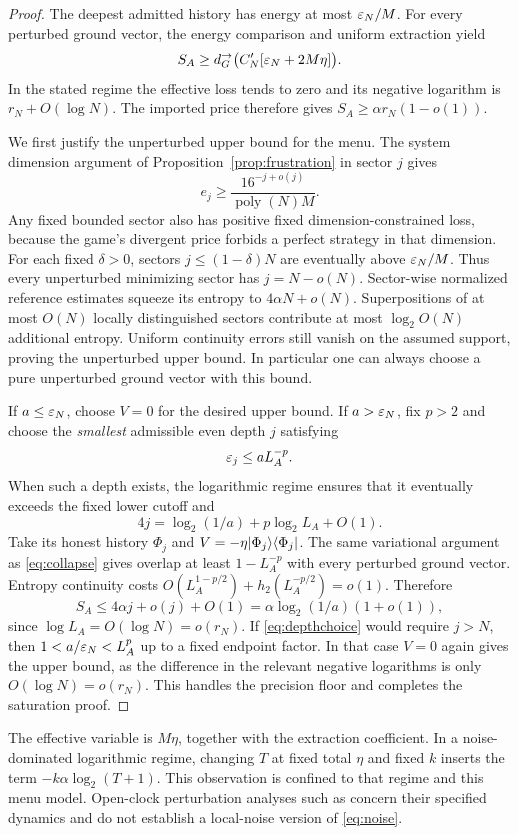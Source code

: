 \begin{proof}
The deepest admitted history has energy at most $\varepsilon_N/M$.
For every perturbed ground vector, the energy comparison and uniform
extraction yield
\[
 S_A\geq d_G^{\to}\bigl(C'_N[\varepsilon_N+2M\eta]\bigr).
\]
In the stated regime the effective loss tends to zero and its
negative logarithm is $r_N+O(\log N)$. The imported price therefore
gives $S_A\geq\alpha r_N(1-o(1))$.

We first justify the unperturbed upper bound for the menu. The system
dimension argument of Proposition~\ref{prop:frustration} in sector
$j$ gives
\[
 e_j\geq\frac{16^{-j+o(j)}}{\operatorname{poly}(N)M}.
\]
Any fixed bounded sector also has positive fixed dimension-constrained
loss, because the game's divergent price forbids a perfect strategy
in that dimension. For each fixed $\delta>0$, sectors
$j\leq(1-\delta)N$ are eventually above
$\varepsilon_N/M$. Thus every unperturbed minimizing sector has
$j=N-o(N)$. Sector-wise normalized reference estimates squeeze its
entropy to $4\alpha N+o(N)$. Superpositions of at most $O(N)$
locally distinguished sectors contribute at most $\log_2O(N)$
additional entropy. Uniform continuity errors still vanish on the
assumed support, proving the unperturbed upper bound. In particular
one can always choose a pure unperturbed ground vector with this bound.

If $a\leq\varepsilon_N$, choose $V=0$ for the desired upper bound.
If $a>\varepsilon_N$, fix $p>2$ and choose the \emph{smallest} admissible
even depth $j$ satisfying
\begin{equation}\label{eq:depthchoice}
 \varepsilon_j\leq aL_A^{-p}.
\end{equation}
When such a depth exists, the logarithmic regime ensures that it
eventually exceeds the fixed lower cutoff and
\[
 4j=\log_2(1/a)+p\log_2L_A+O(1).
\]
Take its honest history $\Phi_j$ and
$V=-\eta\lvert\Phi_j\rangle\langle\Phi_j\rvert$. The same variational argument
as \eqref{eq:collapse} gives overlap at least $1-L_A^{-p}$ with
every perturbed ground vector. Entropy continuity costs
$O(L_A^{1-p/2})+h_2(L_A^{-p/2})=o(1)$. Therefore
\[
 S_A\leq4\alpha j+o(j)+O(1)
       =\alpha\log_2(1/a)(1+o(1)),
\]
since $\log L_A=O(\log N)=o(r_N)$.
If \eqref{eq:depthchoice} would require $j>N$, then
$1<a/\varepsilon_N<L_A^p$ up to a fixed endpoint factor. In that case
$V=0$ again gives the upper bound, as the difference in the relevant
negative logarithms is only $O(\log N)=o(r_N)$. This handles the
precision floor and completes the saturation proof.
\end{proof}

The effective variable is $M\eta$, together with the extraction
coefficient. In a noise-dominated logarithmic regime, changing $T$ at
fixed total $\eta$ and fixed $k$ inserts the term
$-k\alpha\log_2(T+1)$. This observation is confined to that regime
and this menu model. Open-clock perturbation analyses such as
\cite{tempel} concern their specified dynamics and do not establish
a local-noise version of \eqref{eq:noise}.
